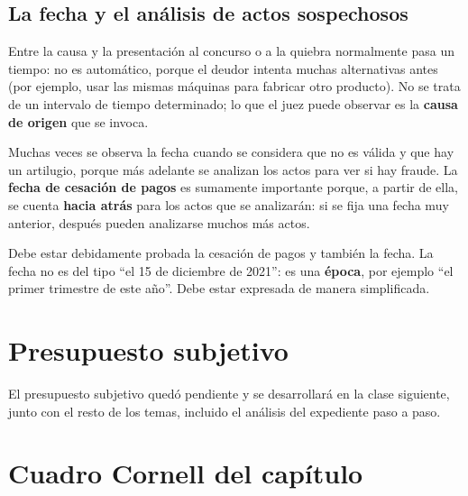 \documentclass[12pt,oneside]{book}
\begin{document}
\subsection{La fecha y el análisis de actos sospechosos}

Entre la causa y la presentación al concurso o a la quiebra normalmente pasa un tiempo: no es automático, porque el deudor intenta muchas alternativas antes (por ejemplo, usar las mismas máquinas para fabricar otro producto). No se trata de un intervalo de tiempo determinado; lo que el juez puede observar es la \textbf{causa de origen} que se invoca.

Muchas veces se observa la fecha cuando se considera que no es válida y que hay un artilugio, porque más adelante se analizan los actos para ver si hay fraude. La \textbf{fecha de cesación de pagos} es sumamente importante porque, a partir de ella, se cuenta \textbf{hacia atrás} para los actos que se analizarán: si se fija una fecha muy anterior, después pueden analizarse muchos más actos.

\begin{important}
Debe estar debidamente probada la cesación de pagos y también la fecha. La fecha no es del tipo ``el 15 de diciembre de 2021'': es una \textbf{época}, por ejemplo ``el primer trimestre de este año''. Debe estar expresada de manera simplificada.
\end{important}

\section{Presupuesto subjetivo}

El presupuesto subjetivo quedó pendiente y se desarrollará en la clase siguiente, junto con el resto de los temas, incluido el análisis del expediente paso a paso.

\section{Cuadro Cornell del capítulo}
\end{document}
